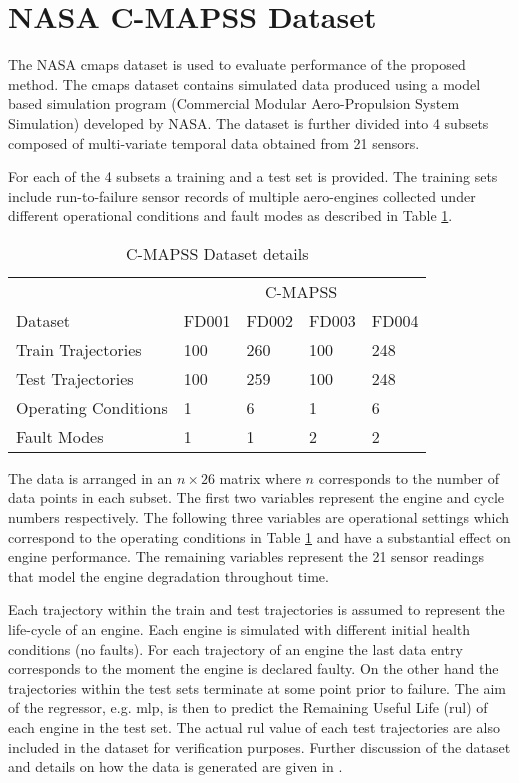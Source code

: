 \section{NASA C-MAPSS Dataset}
\label{sec:rul_dataset}

The NASA \gls{cmaps} dataset \cite{CMAPS2008} is used to evaluate performance of the proposed method. The \gls{cmaps} dataset contains simulated data produced using a model based simulation program (Commercial Modular Aero-Propulsion System Simulation) developed by NASA. The dataset is further divided into 4 subsets composed of multi-variate temporal data obtained from 21 sensors.

For each of the 4 subsets a training and a test set is provided. The training sets include run-to-failure sensor records of multiple aero-engines collected under different operational conditions and fault modes as described in Table \ref{table:cmapss}.

\begin{table}[!htb]
\centering
\begin{tabular}{l | l l l l}
	\hline
	 & \multicolumn{4}{c}{C-MAPSS}\\  
	 Dataset & FD001 & FD002 & FD003 & FD004\\
  	\hline
  	Train Trajectories & 100 & 260 & 100 & 248\\
  	Test Trajectories & 100 & 259 & 100 & 248\\
  	Operating Conditions & 1 & 6 & 1 & 6\\
  	Fault Modes & 1 & 1 & 2 & 2\\
  	\hline
\end{tabular}
\caption{C-MAPSS Dataset details}
\label{table:cmapss}
\end{table}

The data is arranged in an $n\times26$ matrix where $n$ corresponds to the number of data points in each subset. The first two variables represent the engine and cycle numbers respectively. The following three variables are operational settings which correspond to the operating conditions in Table \ref{table:cmapss} and have a substantial effect on engine performance. The remaining variables represent the 21 sensor readings that model the engine degradation throughout time.

Each trajectory within the train and test trajectories is assumed to represent the life-cycle of an engine. Each engine is simulated with different initial health conditions (no faults). For each trajectory of an engine the last data entry corresponds to the moment the engine is declared faulty. On the other hand the trajectories within the test sets terminate at some point prior to failure. The aim of the regressor, e.g. \gls{mlp}, is then to predict the Remaining Useful Life (\gls{rul}) of each engine in the test set. The actual \gls{rul} value of each test trajectories are also included in the dataset for verification purposes. Further discussion of the dataset and details on how the data is generated are given in \cite{Saxena2008}.

